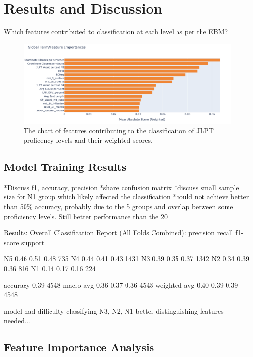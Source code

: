 \chapter{Results and Discussion}
Which features contributed to classification at each level as per the EBM?

\begin{figure}[h!]
    \centering
    \includegraphics[scale=.4]{img/feature_importance}
    \caption{The chart of features contributing to the classificaiton of JLPT proficency levels and their weighted scores.}
    \label{fig:featureimportance}
\end{figure}

\section{Model Training Results}
*Discuss f1, accuracy, precision
*share confusion matrix
*discuss small sample size for N1 group which likely affected the classification
*could not achieve better than 50\% accuracy, probably due to the 5 groups and overlap between some proficiency
levels. Still better performance than the 20%

Results:
 Overall Classification Report (All Folds Combined):
              precision    recall  f1-score   support

          N5       0.46      0.51      0.48       735
          N4       0.44      0.41      0.43      1431
          N3       0.39      0.35      0.37      1342
          N2       0.34      0.39      0.36       816
          N1       0.14      0.17      0.16       224

    accuracy                           0.39      4548
   macro avg       0.36      0.37      0.36      4548
weighted avg       0.40      0.39      0.39      4548

model had difficulty classifying N3, N2, N1 better distinguishing features needed...
\section{Feature Importance Analysis}

